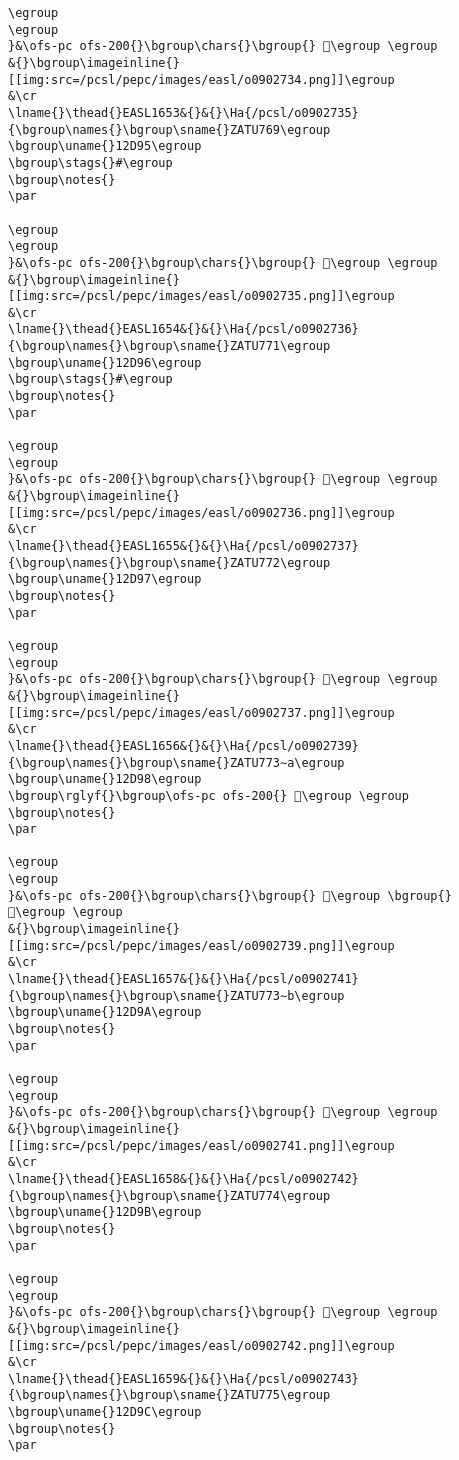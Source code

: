 \begin{verbatim}
\egroup
\egroup
}&\ofs-pc ofs-200{}\bgroup\chars{}\bgroup{} 𒶔\egroup \egroup
&{}\bgroup\imageinline{}[[img:src=/pcsl/pepc/images/easl/o0902734.png]]\egroup
&\cr
\lname{}\thead{}EASL1653&{}&{}\Ha{/pcsl/o0902735}{\bgroup\names{}\bgroup\sname{}ZATU769\egroup
\bgroup\uname{}12D95\egroup
\bgroup\stags{}#\egroup
\bgroup\notes{}
\par 

\egroup
\egroup
}&\ofs-pc ofs-200{}\bgroup\chars{}\bgroup{} 𒶕\egroup \egroup
&{}\bgroup\imageinline{}[[img:src=/pcsl/pepc/images/easl/o0902735.png]]\egroup
&\cr
\lname{}\thead{}EASL1654&{}&{}\Ha{/pcsl/o0902736}{\bgroup\names{}\bgroup\sname{}ZATU771\egroup
\bgroup\uname{}12D96\egroup
\bgroup\stags{}#\egroup
\bgroup\notes{}
\par 

\egroup
\egroup
}&\ofs-pc ofs-200{}\bgroup\chars{}\bgroup{} 𒶖\egroup \egroup
&{}\bgroup\imageinline{}[[img:src=/pcsl/pepc/images/easl/o0902736.png]]\egroup
&\cr
\lname{}\thead{}EASL1655&{}&{}\Ha{/pcsl/o0902737}{\bgroup\names{}\bgroup\sname{}ZATU772\egroup
\bgroup\uname{}12D97\egroup
\bgroup\notes{}
\par 

\egroup
\egroup
}&\ofs-pc ofs-200{}\bgroup\chars{}\bgroup{} 𒶗\egroup \egroup
&{}\bgroup\imageinline{}[[img:src=/pcsl/pepc/images/easl/o0902737.png]]\egroup
&\cr
\lname{}\thead{}EASL1656&{}&{}\Ha{/pcsl/o0902739}{\bgroup\names{}\bgroup\sname{}ZATU773∼a\egroup
\bgroup\uname{}12D98\egroup
\bgroup\rglyf{}\bgroup\ofs-pc ofs-200{} 𒶘\egroup \egroup
\bgroup\notes{}
\par 

\egroup
\egroup
}&\ofs-pc ofs-200{}\bgroup\chars{}\bgroup{} 𒶘\egroup \bgroup{} 𒶙\egroup \egroup
&{}\bgroup\imageinline{}[[img:src=/pcsl/pepc/images/easl/o0902739.png]]\egroup
&\cr
\lname{}\thead{}EASL1657&{}&{}\Ha{/pcsl/o0902741}{\bgroup\names{}\bgroup\sname{}ZATU773∼b\egroup
\bgroup\uname{}12D9A\egroup
\bgroup\notes{}
\par 

\egroup
\egroup
}&\ofs-pc ofs-200{}\bgroup\chars{}\bgroup{} 𒶚\egroup \egroup
&{}\bgroup\imageinline{}[[img:src=/pcsl/pepc/images/easl/o0902741.png]]\egroup
&\cr
\lname{}\thead{}EASL1658&{}&{}\Ha{/pcsl/o0902742}{\bgroup\names{}\bgroup\sname{}ZATU774\egroup
\bgroup\uname{}12D9B\egroup
\bgroup\notes{}
\par 

\egroup
\egroup
}&\ofs-pc ofs-200{}\bgroup\chars{}\bgroup{} 𒶛\egroup \egroup
&{}\bgroup\imageinline{}[[img:src=/pcsl/pepc/images/easl/o0902742.png]]\egroup
&\cr
\lname{}\thead{}EASL1659&{}&{}\Ha{/pcsl/o0902743}{\bgroup\names{}\bgroup\sname{}ZATU775\egroup
\bgroup\uname{}12D9C\egroup
\bgroup\notes{}
\par 


\end{verbatim}
